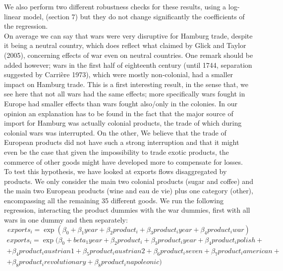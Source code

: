 \documentclass[12pt,a4paper,titlepage,english]{article}
\begin{document}


We also perform two different robustness checks for these results, using a log-linear model, (section 7) but they do not change significantly the coefficients of the regression. \\
On average we can say that wars were very disruptive for Hamburg trade, despite it being a neutral country, which does reflect what claimed by Glick and Taylor (2005), concerning effects of war even on neutral countries. One remark should be added however; wars in the first half of eighteenth century (until 1744, separation suggested by Carrière 1973), which were mostly non-colonial, had a smaller impact on Hamburg trade. This is a first interesting result, in the sense that, we see here that not all wars had the same effects; more specifically wars fought in Europe had smaller effects than wars fought also/only in the colonies. In our opinion an explanation has to be found in the fact that the major source of import for Hamburg was actually colonial products, the trade of which during colonial wars was interrupted. On the other, We believe that the trade of European products did not have such a strong interruption and that it might even be the case that given the impossibility to trade exotic products, the commerce of other goods might have developed more to compensate for losses. \\
To test this hypothesis, we have looked at exports flows disaggregated by products. We only consider the main two colonial products (sugar and coffee) and the main two European products (wine and eau de vie) plus one category (other), encompassing all the remaining 35 different goods. We run the following regression, interacting the product dummies with the war dummies, first with all wars in one dummy and then separately:
\begin{equation}
exports_i=\exp(\beta_0+\beta_1year+ 
\beta_2product_i + \beta_3product_iyear+\beta_4product_iwar)
\end{equation}
\begin{multline}
exports_i=\exp(\beta_0+beta_1year+\beta_2product_i + \beta_3product_iyear+\beta_4product_ipolish + \\ +\beta_4product_iaustrian1 + \beta_5product_iaustrian2 + \beta_6product_iseven +\beta_7product_iamerican+  \\ +\beta_8product_irevolutionary+\beta_8product_inapoleonic)
\end{multline}
\end{document}
